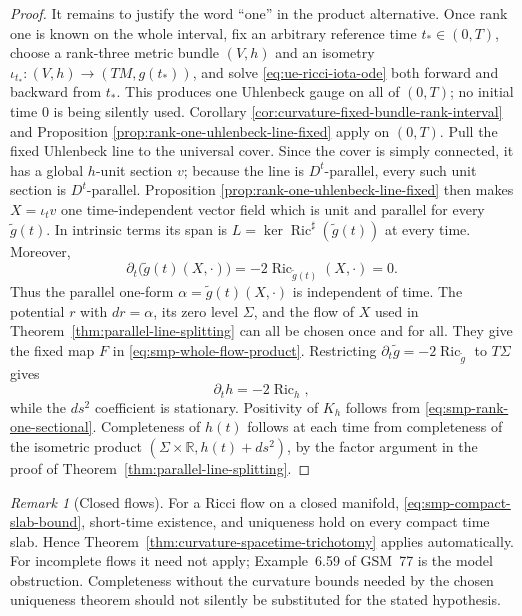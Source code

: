 \documentclass[10pt]{coll-l}
\newcommand{\R}{\mathbb{R}}
\theoremstyle{definition}
\theoremstyle{remark}
\newtheorem{remark}[theorem]{Remark}
\numberwithin{section}{chapter}
\numberwithin{equation}{chapter}
\newcommand{\Ric}{\operatorname{Ric}}
\begin{document}
\begin{proof}
It remains to justify the word ``one'' in the product alternative.  Once
rank one is known on the whole interval, fix an arbitrary reference time
$t_*\in(0,T)$, choose a rank-three metric bundle $(V,h)$ and an isometry
$\iota_{t_*}\colon(V,h)\to(TM,g(t_*))$, and solve
\eqref{eq:ue-ricci-iota-ode} both forward and backward from $t_*$.  This
produces one Uhlenbeck gauge on all of $(0,T)$; no initial time $0$ is being
silently used.  Corollary
\ref{cor:curvature-fixed-bundle-rank-interval} and Proposition
\ref{prop:rank-one-uhlenbeck-line-fixed} apply on $(0,T)$.  Pull the fixed
Uhlenbeck line to the universal cover.  Since the cover is simply connected,
it has a global $h$-unit section $v$; because the line is $D^t$-parallel,
every such unit section is $D^t$-parallel.  Proposition
\ref{prop:rank-one-uhlenbeck-line-fixed} then makes
$X=\iota_tv$ one time-independent vector field which is unit and parallel
for every $\widetilde g(t)$.  In intrinsic terms its span is
$L=\ker\Ric^\sharp(\widetilde g(t))$ at every time.  Moreover,
\begin{equation}
 \partial_t\bigl(\widetilde g(t)(X,\cdot)\bigr)
     =-2\Ric_{\widetilde g(t)}(X,\cdot)=0.                \label{eq:smp-fixed-line-one-form}
\end{equation}
Thus the parallel one-form $\alpha=\widetilde g(t)(X,\cdot)$ is independent
of time.  The potential $r$ with $dr=\alpha$, its zero level $\Sigma$, and
the flow of $X$ used in
Theorem~\ref{thm:parallel-line-splitting} can all be chosen once and
for all.  They give the fixed map $F$ in
\eqref{eq:smp-whole-flow-product}.  Restricting
$\partial_t\widetilde g=-2\Ric_{\widetilde g}$ to $T\Sigma$ gives
\[
                              \partial_t h=-2\Ric_h,
\]
while the $ds^2$ coefficient is stationary.  Positivity of $K_h$ follows
from \eqref{eq:smp-rank-one-sectional}.  Completeness of $h(t)$ follows at
each time from completeness of the isometric product
$(\Sigma\times\R,h(t)+ds^2)$, by the factor argument in the proof of
Theorem~\ref{thm:parallel-line-splitting}.
\end{proof}

\begin{remark}[Closed flows]
\label{rem:curvature-whole-flow-closed}
For a Ricci flow on a closed manifold,
\eqref{eq:smp-compact-slab-bound}, short-time existence, and uniqueness hold
on every compact time slab.  Hence
Theorem~\ref{thm:curvature-spacetime-trichotomy} applies automatically.
For incomplete flows it need not apply; Example~6.59 of GSM~77 is the
model obstruction.  Completeness without the curvature bounds needed by the
chosen uniqueness theorem should not silently be substituted for the
stated hypothesis.
\end{remark}
\end{document}
